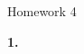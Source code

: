 \documentclass[letterpaper, 11pt]{article}
\newcommand{\hwnumber}[1]{\medskip \noindent\textbf{#1.} \smallskip}
\begin{document}
\begin{center}
	{\LARGE Homework 4}\\
\end{center}

\hwnumber{1}
\end{document}
